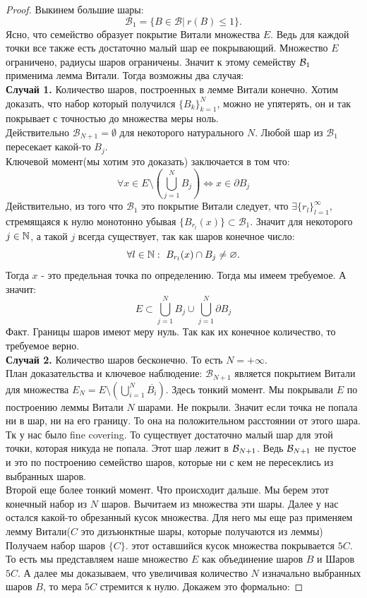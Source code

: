 \begin{proof}
    Выкинем большие шары:
    $$\mathcal{B}_1 = \{B \in \mathcal{B} | \  r(B) \leq 1\}. $$
    Ясно, что семейство образует покрытие Витали множества $E$. Ведь для каждой точки все также есть достаточно малый шар ее покрывающий. Множество $E$ ограничено, радиусы шаров ограничены. Значит к этому семейству $\mathcal{B}_1$ применима лемма Витали. Тогда возможны два случая: \\
    \textbf{Случай 1.} Количество шаров, построенных в лемме Витали конечно. Хотим доказать, что набор который получился $\{B_k\}_{k=1}^{N}$, можно не упятерять, он и так покрывает с точностью до множества меры ноль.\\ Действительно $\mathcal{B}_{N + 1} = \emptyset$ для некоторого натурального $N.$ Любой шар из $\mathcal{B}_1$ пересекает какой-то $B_j.$ \\Ключевой момент(мы хотим это доказать) заключается в том что:
        $$\forall x \in E \setminus (\bigcup_{j = 1}^{N}B_j) \Longleftrightarrow x \in \partial B_j$$
        Действительно, из того что $\mathcal{B}_1$ это покрытие Витали следует, что $\exists \{r_l\}_{l=1}^{\infty}$, стремящаяся к нулю монотонно убывая  $\{B_{r_l}(x)\} \subset \mathcal{B}_1$.
        Значит для некоторого $j \in \mathbb{N}$, а такой $j$ всегда существует, так как шаров конечное число:
        $$\forall l \in \mathbb{N}: \ B_{r_l}(x) \cap B_j \neq \varnothing.$$
        Тогда $x$ - это предельная точка по определению. Тогда мы имеем требуемое. А значит:
        $$E \subset \bigcup_{j = 1}^{N}B_j \cup \bigcup_{j = 1}^{N}\partial B_j$$
        Факт. Границы шаров имеют меру нуль. Так как их конечное количество, то требуемое верно. \\
    \textbf{Случай 2.} Количество шаров бесконечно. То есть $N=+\infty$.\\
    План доказательства и ключевое наблюдение: $\mathcal{B}_{N + 1}$ является покрытием Витали для множества $E_N = E \setminus \left( \bigcup\limits_{i = 1}^{N} \overline{B_i} \right).$ Здесь тонкий момент. Мы покрывали $E$ по построению леммы Витали $N$ шарами. Не покрыли. Значит если точка не попала ни в шар, ни на его границу. То она на положительном расстоянии от этого шара. Тк у нас было fine covering. То существует достаточно малый шар для этой точки, которая никуда не попала. Этот шар лежит в $\mathcal{B}_{N+1}$. Ведь $\mathcal{B}_{N+1}$ не пустое и это по построению семейство шаров, которые ни с кем не пересеклись из выбранных шаров. \\
    Второй еще более тонкий момент. Что происходит дальше. Мы берем этот конечный набор из $N$ шаров. Вычитаем из множества эти шары. Далее у нас остался какой-то обрезанный кусок множества. Для него мы еще раз применяем лемму Витали($C$ это дизъюнктные шары, которые получаются из леммы) Получаем набор шаров $\{C\}$. этот оставшийся кусок множества покрывается $5C$. То есть мы представляем наше множество $E$ как объединение шаров $B$ и Шаров $5C$. А далее мы доказываем, что увеличивая количество $N$ изначально выбранных шаров $B$, то мера $5C$ стремится к нулю. Докажем это формально:
    

\end{proof}
